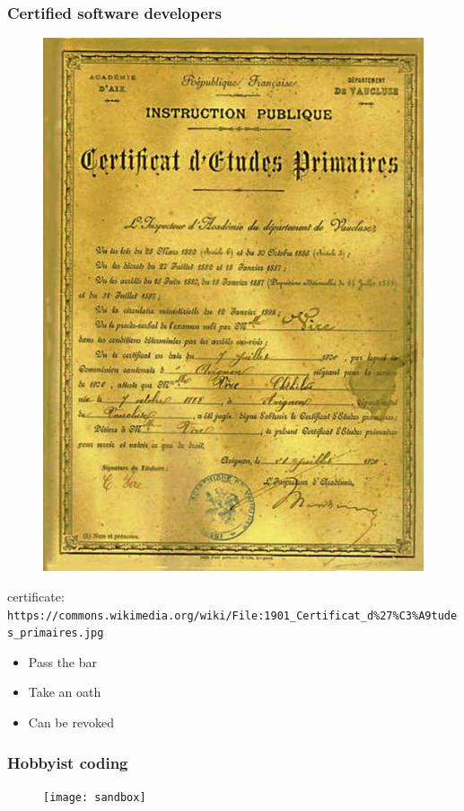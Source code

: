 \begin{frame}[fragile]
\frametitle{Certified software developers}


\begin{figure}
\includegraphics[scale=0.2]{certificate}
\end{figure}

\end{frame}

certificate: \verb|https://commons.wikimedia.org/wiki/File:1901_Certificat_d%27%C3%A9tudes_primaires.jpg|

\begin{itemize}
\item Pass the bar
\item Take an oath
\item Can be revoked
\end{itemize}

\begin{frame}[fragile]
\frametitle{Hobbyist coding}

\begin{figure}
\texttt{[image: sandbox]}
\end{figure}

\end{frame}

